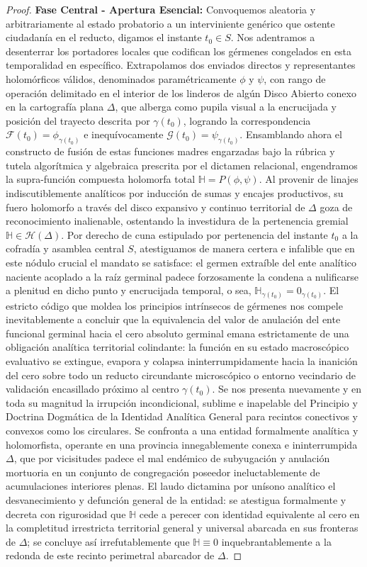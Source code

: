 \documentclass[11pt,a4paper]{article}
\theoremstyle{definition}
\theoremstyle{remark}
\numberwithin{equation}{section}
\begin{document}
\begin{proof}
\textbf{Fase Central - Apertura Esencial:} Convoquemos aleatoria y arbitrariamente al estado probatorio a un interviniente genérico que ostente ciudadanía en el reducto, digamos el instante $t_0 \in S$. Nos adentramos a desenterrar los portadores locales que codifican los gérmenes congelados en esta temporalidad en específico. Extrapolamos dos enviados directos y representantes holomórficos válidos, denominados paramétricamente $\phi$ y $\psi$, con rango de operación delimitado en el interior de los linderos de algún Disco Abierto conexo en la cartografía plana $\Delta$, que alberga como pupila visual a la encrucijada y posición del trayecto descrita por $\gamma(t_0)$, logrando la correspondencia $\mathcal{F}(t_0) = \phi_{\gamma(t_0)}$ e inequívocamente $\mathcal{G}(t_0) = \psi_{\gamma(t_0)}$.
Ensamblando ahora el constructo de fusión de estas funciones madres engarzadas bajo la rúbrica y tutela algorítmica y algebraica prescrita por el dictamen relacional, engendramos la supra-función compuesta holomorfa total $\mathbb{H} = P(\phi, \psi)$. Al provenir de linajes indiscutiblemente analíticos por inducción de sumas y encajes productivos, su fuero holomorfo a través del disco expansivo y continuo territorial de $\Delta$ goza de reconocimiento inalienable, ostentando la investidura de la pertenencia gremial $\mathbb{H} \in \mathcal{H}(\Delta)$.
Por derecho de cuna estipulado por pertenencia del instante $t_0$ a la cofradía y asamblea central $S$, atestiguamos de manera certera e infalible que en este nódulo crucial el mandato se satisface: el germen extraíble del ente analítico naciente acoplado a la raíz germinal padece forzosamente la condena a nulificarse a plenitud en dicho punto y encrucijada temporal, o sea, $\mathbb{H}_{\gamma(t_0)} = 0_{\gamma(t_0)}$.
El estricto código que moldea los principios intrínsecos de gérmenes nos compele inevitablemente a concluir que la equivalencia del valor de anulación del ente funcional germinal hacia el cero absoluto germinal emana estrictamente de una obligación analítica territorial colindante: la función en su estado macroscópico evaluativo se extingue, evapora y colapsa ininterrumpidamente hacia la inanición del cero sobre todo un reducto circundante microscópico o entorno vecindario de validación encasillado próximo al centro $\gamma(t_0)$.
Se nos presenta nuevamente y en toda su magnitud la irrupción incondicional, sublime e inapelable del Principio y Doctrina Dogmática de la Identidad Analítica General para recintos conectivos y convexos como los circulares. Se confronta a una entidad formalmente analítica y holomorfista, operante en una provincia innegablemente conexa e ininterrumpida $\Delta$, que por vicisitudes padece el mal endémico de subyugación y anulación mortuoria en un conjunto de congregación poseedor ineluctablemente de acumulaciones interiores plenas. El laudo dictamina por unísono analítico el desvanecimiento y defunción general de la entidad: se atestigua formalmente y decreta con rigurosidad que $\mathbb{H}$ cede a perecer con identidad equivalente al cero en la completitud irrestricta territorial general y universal abarcada en sus fronteras de $\Delta$; se concluye así irrefutablemente que $\mathbb{H} \equiv 0$ inquebrantablemente a la redonda de este recinto perimetral abarcador de $\Delta$.

\end{proof}
\end{document}

